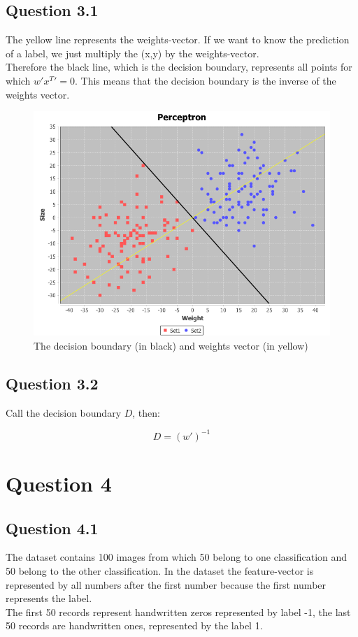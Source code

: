 \documentclass[11pt,twoside,a4paper]{article}
\begin{document}
	\subsection{Question 3.1}
	The yellow line represents the weights-vector. If we want to know the prediction of a label, we just multiply the (x,y) by the weights-vector. \\
	Therefore the black line, which is the decision boundary, represents all points for which $w' x^{T}' = 0$. This means that the decision boundary is the inverse of the weights vector.  
	
\begin{figure}[ht]
    \centering
    \includegraphics[width=\textwidth]{perceptron.png}
    \caption{The decision boundary (in black) and weights vector (in yellow)}
\end{figure}
	
	\subsection{Question 3.2}
	Call the decision boundary $D$, then:
	
	\begin{equation}
		D = (w')^{-1}
	\end{equation}
	
\section{Question 4}

	\subsection{Question 4.1}
	The dataset contains 100 images from which 50 belong to one classification and 50 belong to the other classification. In the dataset the feature-vector is represented by all numbers after the first number because the first number represents the label. \\
	The first 50 records represent handwritten zeros represented by label -1, the last 50 records are handwritten ones, represented by the label 1.
	
\end{document}
